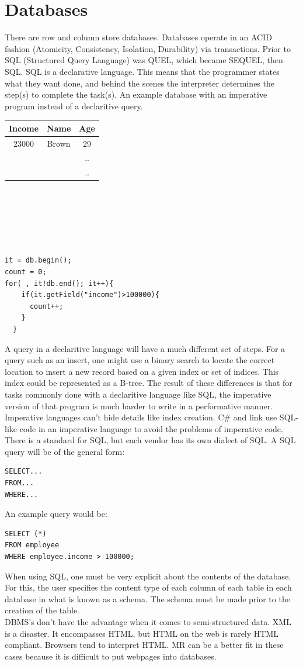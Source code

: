\documentclass[twoside]{article}
\begin{document}
\section{Databases}
There are row and column store databases. Databases operate in an ACID fashion (Atomicity, Consistency, Isolation, Durability) via transactions. Prior to SQL (Structured Query Language) was QUEL, which became SEQUEL, then SQL. SQL is a declarative language. This means that the programmer states what they want done, and behind the scenes the interpreter determines the step(s) to complete the task(s).
An example database with an imperative program instead of a declaritive query.\\
\begin{tabular}{c|c|c}
Income & Name & Age\\
\hline
23000 & Brown & 29 \\
 & & .. \\
 & & .. \\
 \hline
\end{tabular}
\\
\\
\\
\\
\\
\begin{lstlisting}
it = db.begin();
count = 0;
for( , it!db.end(); it++){
    if(it.getField("income")>100000){
      count++;
    }
  }
\end{lstlisting}

A query in a declaritive language will have a much different set of steps. For a query such as an insert, one might use a binary search to locate the correct location to insert a new record based on a given index or set of indices. This index could be represented as a B-tree. The result of these differences is that for tasks commonly done with a declaritive language like SQL, the imperative version of that program is much harder to write in a performative manner. Imperative languages can't hide details like index creation. C\# and link use SQL-like code in an imperative language to avoid the problems of imperative code.\\
There is a standard for SQL, but each vendor has its own dialect of SQL. A SQL query will be of the general form:\\
\begin{lstlisting}
SELECT...
FROM...
WHERE...
\end{lstlisting}
An example query would be:
\begin{lstlisting}
SELECT (*)
FROM employee 
WHERE employee.income > 100000;
\end{lstlisting}
When using SQL, one must be very explicit about the contents of the database. For this, the user specifies the content type of each column of each table in each database in what is known as a schema. The schema must be made prior to the creation of the table. \\
DBMS's don't have the advantage when it comes to semi-structured data. XML is a disaster. It encompasses HTML, but HTML on the web is rarely HTML compliant. Browsers tend to interpret HTML. MR can be a better fit in these cases because it is difficult to put webpages into databases.
\end{document}
